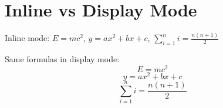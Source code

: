 \documentclass{article}
\begin{document}
\section*{Inline vs Display Mode}

Inline mode: $E = mc^2$, $y = ax^2 + bx + c$, $\sum_{i=1}^n i = \frac{n(n+1)}{2}$

Same formulas in display mode:
\[
E = mc^2
\]
\[
y = ax^2 + bx + c
\]
\[
\sum_{i=1}^n i = \frac{n(n+1)}{2}
\]
\end{document}
